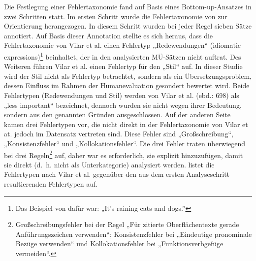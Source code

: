 Die Festlegung einer Fehlertaxonomie fand auf Basis eines Bottom-up-Ansat\-zes in zwei Schritten statt. Im ersten Schritt wurde die Fehlertaxonomie von \citet{VilarEtAl2006} zur Orientierung herangezogen. In diesem Schritt wurden bei jeder Regel sieben Sätze annotiert. Auf Basis dieser Annotation stellte es sich heraus, dass die Fehlertaxonomie von Vilar et al. einen Fehlertyp „Redewendungen“ (idiomatic expressions)\footnote{{Das Beispiel von \citet{VilarEtAl2006} dafür war: „It’s raining cats and dogs.”}} beinhaltet, der in den analysierten MÜ-Sätzen nicht auftrat. Des Weiteren führen Vilar et al. einen Fehlertyp für den „Stil“ auf. In dieser Studie wird der Stil nicht als Fehlertyp betrachtet, sondern als ein Übersetzungsproblem, dessen Einfluss im Rahmen der Humanevaluation gesondert bewertet wird. Beide Fehlertypen (Redewendungen und Stil) werden von Vilar et al. (ebd.: 698) als „less important“ bezeichnet, dennoch wurden sie nicht wegen ihrer Bedeutung, sondern aus den genannten Gründen ausgeschlossen. Auf der anderen Seite kamen drei Fehlertypen vor, die nicht direkt in der Fehlertaxonomie von Vilar et at. jedoch im Datensatz vertreten sind. Diese Fehler sind „Großschreibung“, „Konsistenzfehler“ und „Kollokationsfehler“. Die drei Fehler traten überwiegend bei drei Regeln\footnote{{Großschreibungsfehler bei der Regel „Für zitierte Oberflächentexte gerade Anführungszeichen verwenden“; Konsistenzfehler bei „Eindeutige pronominale Bezüge verwenden“ und Kollokationsfehler bei „Funktionsverbgefüge vermeiden“.}} auf, daher war es erforderlich, sie explizit hinzuzufügen, damit sie direkt (d.~h. nicht als Unterkategorie) analysiert werden.  listet die Fehlertypen nach Vilar et al. gegenüber den aus dem ersten Analyseschritt resultierenden Fehlertypen auf.


